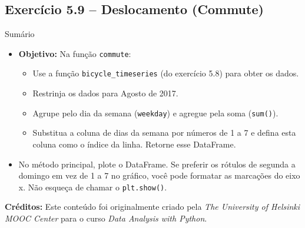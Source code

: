 \documentclass[11pt,a4paper]{article}
\begin{document}
\subsection*{Exercício 5.9 -- Deslocamento (Commute)}
\begin{exercicio}{Sumário}
\begin{itemize}
    \item \textbf{Objetivo:} Na função \texttt{commute}:
    \begin{itemize}
        \item Use a função \texttt{bicycle\_timeseries} (do exercício 5.8) para obter os dados.
        \item Restrinja os dados para Agosto de 2017.
        \item Agrupe pelo dia da semana (\texttt{weekday}) e agregue pela soma (\texttt{sum()}).
        \item Substitua a coluna de dias da semana por números de 1 a 7 e defina esta coluna como o índice da linha. Retorne esse DataFrame.
    \end{itemize}
    \item No método principal, plote o DataFrame. Se preferir os rótulos de segunda a domingo em vez de 1 a 7 no gráfico, você pode formatar as marcações do eixo x. Não esqueça de chamar o \texttt{plt.show()}.
\end{itemize}
\end{exercicio}

\vspace{2em}
\noindent\textbf{Créditos:} Este conteúdo foi originalmente criado pela \textit{The University of Helsinki MOOC Center} para o curso \textit{Data Analysis with Python}.
\end{document}

